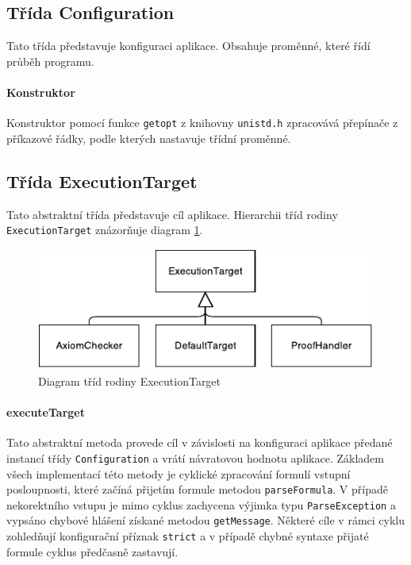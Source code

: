 \documentclass[thesis=B,czech,hidelinks]{thesis}[2012/06/26]
\begin{document}
\subsection{Třída Configuration}

Tato třída představuje konfiguraci aplikace. Obsahuje proměnné, které řídí průběh programu.

\paragraph{Konstruktor}

Konstruktor pomocí funkce \texttt{getopt} z knihovny \texttt{unistd.h} zpracovává přepínače z příkazové řádky, podle kterých nastavuje třídní proměnné.

\subsection{Třída ExecutionTarget}

Tato abstraktní třída představuje cíl aplikace. Hierarchii tříd rodiny \texttt{ExecutionTarget} znázorňuje diagram \ref{fig:execution_target}.

\begin{figure}
\centering
\caption{Diagram tříd rodiny ExecutionTarget}
\label{fig:execution_target}
\includegraphics{diagrams/execution_target}
\end{figure}

\paragraph{executeTarget}

Tato abstraktní metoda provede cíl v závislosti na konfiguraci aplikace předané instancí třídy \texttt{Configuration} a vrátí návratovou hodnotu aplikace. Základem všech implementací této metody je cyklické zpracování formulí vstupní posloupnosti, které začíná přijetím formule metodou \texttt{parseFormula}. V případě nekorektního vstupu je mimo cyklus zachycena výjimka typu \texttt{ParseException} a vypsáno chybové hlášení získané metodou \texttt{getMessage}. Některé cíle v rámci cyklu zohledňují konfigurační příznak \texttt{strict} a v případě chybné syntaxe přijaté formule cyklus předčasně zastavují.
\end{document}
